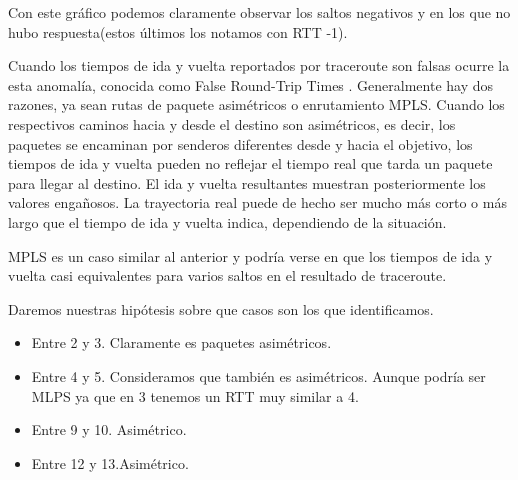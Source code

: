 
Con este gráfico podemos claramente observar los saltos negativos y en los que no hubo respuesta(estos
últimos los notamos con RTT -1).

Cuando los tiempos de ida y vuelta reportados por traceroute son falsas ocurre la esta anomalía, conocida
como False Round-Trip Times . Generalmente hay dos razones, ya sean rutas de paquete asimétricos o enrutamiento
MPLS. Cuando los respectivos caminos hacia y desde el destino son asimétricos, es decir, los paquetes se
encaminan por senderos diferentes desde y hacia el objetivo, los tiempos de ida y vuelta pueden no
reflejar el tiempo real que tarda un paquete para llegar al destino. El ida y vuelta resultantes muestran
posteriormente los valores engañosos. La trayectoria real puede de hecho ser mucho más corto o más largo
que el tiempo de ida y vuelta indica, dependiendo de la situación.

MPLS es un caso similar al anterior y podría verse en que los tiempos de ida y vuelta casi equivalentes
para varios saltos en el resultado de traceroute.

Daremos nuestras hipótesis sobre que casos son los que identificamos.

\begin{itemize}
\item Entre 2 y 3. Claramente es paquetes asimétricos.
\item Entre 4 y 5. Consideramos que también es asimétricos. Aunque podría ser MLPS ya que en 3 tenemos un
RTT muy similar a 4.
\item Entre 9 y 10. Asimétrico.
\item Entre 12 y 13.Asimétrico.
\end{itemize}



